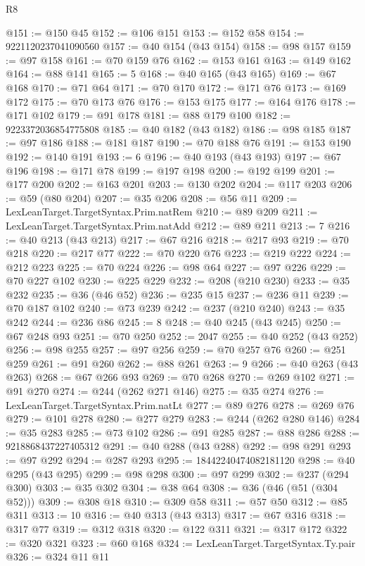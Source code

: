 \begin{lexlean}{R8}
\begin{coremodule}
@151 := @150 @45
@152 := @106 @151
@153 := @152 @58
@154 := 9221120237041090560
@157 := @40 @154 (@43 @154)
@158 := @98 @157
@159 := @97 @158
@161 := @70 @159 @76
@162 := @153 @161
@163 := @149 @162
@164 := @88 @141
@165 := 5
@168 := @40 @165 (@43 @165)
@169 := @67 @168
@170 := @71 @64
@171 := @70 @170
@172 := @171 @76
@173 := @169 @172
@175 := @70 @173 @76
@176 := @153 @175
@177 := @164 @176
@178 := @171 @102
@179 := @91 @178
@181 := @88 @179 @100
@182 := 9223372036854775808
@185 := @40 @182 (@43 @182)
@186 := @98 @185
@187 := @97 @186
@188 := @181 @187
@190 := @70 @188 @76
@191 := @153 @190
@192 := @140 @191
@193 := 6
@196 := @40 @193 (@43 @193)
@197 := @67 @196
@198 := @171 @78
@199 := @197 @198
@200 := @192 @199
@201 := @177 @200
@202 := @163 @201
@203 := @130 @202
@204 := @117 @203
@206 := @59 (@80 @204)
@207 := @35 @206
@208 := @56 @11
@209 := LexLeanTarget.TargetSyntax.Prim.natRem
@210 := @89 @209
@211 := LexLeanTarget.TargetSyntax.Prim.natAdd
@212 := @89 @211
@213 := 7
@216 := @40 @213 (@43 @213)
@217 := @67 @216
@218 := @217 @93
@219 := @70 @218
@220 := @217 @77
@222 := @70 @220 @76
@223 := @219 @222
@224 := @212 @223
@225 := @70 @224
@226 := @98 @64
@227 := @97 @226
@229 := @70 @227 @102
@230 := @225 @229
@232 := @208 (@210 @230)
@233 := @35 @232
@235 := @36 (@46 @52)
@236 := @235 @15
@237 := @236 @11
@239 := @70 @187 @102
@240 := @73 @239
@242 := @237 (@210 @240)
@243 := @35 @242
@244 := @236 @86
@245 := 8
@248 := @40 @245 (@43 @245)
@250 := @67 @248 @93
@251 := @70 @250
@252 := 2047
@255 := @40 @252 (@43 @252)
@256 := @98 @255
@257 := @97 @256
@259 := @70 @257 @76
@260 := @251 @259
@261 := @91 @260
@262 := @88 @261
@263 := 9
@266 := @40 @263 (@43 @263)
@268 := @67 @266 @93
@269 := @70 @268
@270 := @269 @102
@271 := @91 @270
@274 := @244 (@262 @271 @146)
@275 := @35 @274
@276 := LexLeanTarget.TargetSyntax.Prim.natLt
@277 := @89 @276
@278 := @269 @76
@279 := @101 @278
@280 := @277 @279
@283 := @244 (@262 @280 @146)
@284 := @35 @283
@285 := @73 @102
@286 := @91 @285
@287 := @88 @286
@288 := 9218868437227405312
@291 := @40 @288 (@43 @288)
@292 := @98 @291
@293 := @97 @292
@294 := @287 @293
@295 := 18442240474082181120
@298 := @40 @295 (@43 @295)
@299 := @98 @298
@300 := @97 @299
@302 := @237 (@294 @300)
@303 := @35 @302
@304 := @38 @64
@308 := @36 (@46 (@51 (@304 @52)))
@309 := @308 @18
@310 := @309 @58
@311 := @57 @50
@312 := @85 @311
@313 := 10
@316 := @40 @313 (@43 @313)
@317 := @67 @316
@318 := @317 @77
@319 := @312 @318
@320 := @122 @311
@321 := @317 @172
@322 := @320 @321
@323 := @60 @168
@324 := LexLeanTarget.TargetSyntax.Ty.pair
@326 := @324 @11 @11

\end{coremodule}
\end{lexlean}

